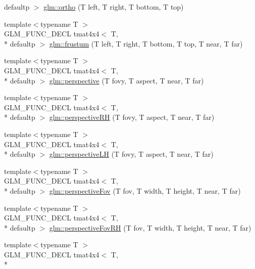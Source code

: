 \begin{DoxyCompactItemize}
defaultp $>$ \hyperlink{group__gtc__matrix__transform_ga45b1b64f99255c07119b4f1aaed04dd7}{glm\-::ortho} (T left, T right, T bottom, T top)
\item 
{\footnotesize template$<$typename T $>$ }\\G\-L\-M\-\_\-\-F\-U\-N\-C\-\_\-\-D\-E\-C\-L tmat4x4$<$ T, \\*
defaultp $>$ \hyperlink{group__gtc__matrix__transform_gada6deb989d4b553fe0f7e3279f3afae1}{glm\-::frustum} (T left, T right, T bottom, T top, T near, T far)
\item 
{\footnotesize template$<$typename T $>$ }\\G\-L\-M\-\_\-\-F\-U\-N\-C\-\_\-\-D\-E\-C\-L tmat4x4$<$ T, \\*
defaultp $>$ \hyperlink{group__gtc__matrix__transform_gac3613dcb6c6916465ad5b7ad5a786175}{glm\-::perspective} (T fovy, T aspect, T near, T far)
\item 
{\footnotesize template$<$typename T $>$ }\\G\-L\-M\-\_\-\-F\-U\-N\-C\-\_\-\-D\-E\-C\-L tmat4x4$<$ T, \\*
defaultp $>$ \hyperlink{group__gtc__matrix__transform_ga5a4fa9f8ffabb2294e48a18bf8fa2f5f}{glm\-::perspective\-R\-H} (T fovy, T aspect, T near, T far)
\item 
{\footnotesize template$<$typename T $>$ }\\G\-L\-M\-\_\-\-F\-U\-N\-C\-\_\-\-D\-E\-C\-L tmat4x4$<$ T, \\*
defaultp $>$ \hyperlink{group__gtc__matrix__transform_ga34048da27c559f1ac8e9550d169dd6f3}{glm\-::perspective\-L\-H} (T fovy, T aspect, T near, T far)
\item 
{\footnotesize template$<$typename T $>$ }\\G\-L\-M\-\_\-\-F\-U\-N\-C\-\_\-\-D\-E\-C\-L tmat4x4$<$ T, \\*
defaultp $>$ \hyperlink{group__gtc__matrix__transform_gae9146e2c550fc8646299e4b900238145}{glm\-::perspective\-Fov} (T fov, T width, T height, T near, T far)
\item 
{\footnotesize template$<$typename T $>$ }\\G\-L\-M\-\_\-\-F\-U\-N\-C\-\_\-\-D\-E\-C\-L tmat4x4$<$ T, \\*
defaultp $>$ \hyperlink{group__gtc__matrix__transform_ga07cd8df791bf90dcb782645fe0b21261}{glm\-::perspective\-Fov\-R\-H} (T fov, T width, T height, T near, T far)
\item 
{\footnotesize template$<$typename T $>$ }\\G\-L\-M\-\_\-\-F\-U\-N\-C\-\_\-\-D\-E\-C\-L tmat4x4$<$ T, \\*

\end{DoxyCompactItemize}

